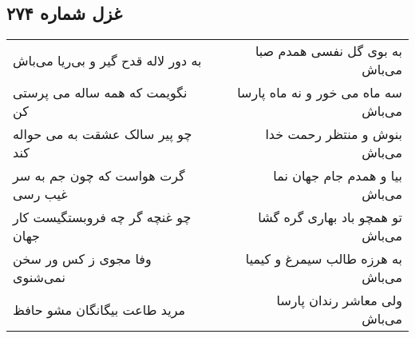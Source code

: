 \begin{center}
\section*{غزل شماره ۲۷۴}
\label{sec:sh274}
\begin{longtable}{l p{0.5cm} r}
به دور لاله قدح گیر و بی‌ریا می‌باش
&&
به بوی گل نفسی همدم صبا می‌باش
\\
نگویمت که همه ساله می پرستی کن
&&
سه ماه می خور و نه ماه پارسا می‌باش
\\
چو پیر سالک عشقت به می حواله کند
&&
بنوش و منتظر رحمت خدا می‌باش
\\
گرت هواست که چون جم به سر غیب رسی
&&
بیا و همدم جام جهان نما می‌باش
\\
چو غنچه گر چه فروبستگیست کار جهان
&&
تو همچو باد بهاری گره گشا می‌باش
\\
وفا مجوی ز کس ور سخن نمی‌شنوی
&&
به هرزه طالب سیمرغ و کیمیا می‌باش
\\
مرید طاعت بیگانگان مشو حافظ
&&
ولی معاشر رندان پارسا می‌باش
\\
\end{longtable}
\end{center}
